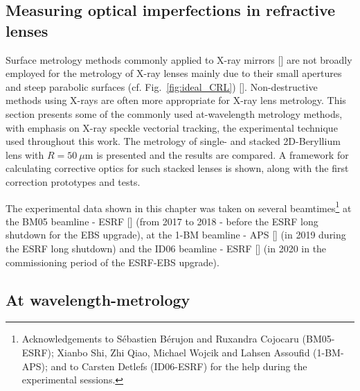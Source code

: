 \begin{refsection}
\chapter{Measuring optical imperfections in refractive lenses}\label{sec:measuring}

Surface metrology methods commonly applied to X-ray mirrors [\cite{Alcock2016, Vivo2019}] are not broadly employed for the metrology of X-ray lenses mainly due to their small apertures and steep parabolic surfaces (cf. Fig.~\ref{fig:ideal_CRL}) [\cite{Lyatun2015}]. Non-destructive methods using X-rays are often more appropriate for X-ray lens metrology. This section presents some of the commonly used at-wavelength metrology methods, with emphasis on X-ray speckle vectorial tracking, the experimental technique used throughout this work. The metrology of single- and stacked 2D-Beryllium lens with $R=50~\mu$m is presented and the results are compared. A framework for calculating corrective optics for such stacked lenses is shown, along with the first correction prototypes and tests.

The experimental data shown in this chapter was taken on several beamtimes\footnote{Acknowledgements to Sébastien Bérujon and Ruxandra Cojocaru (BM05-ESRF); Xianbo Shi, Zhi Qiao, Michael Wojcik and Lahsen Assoufid (1-BM-APS); and to Carsten Detlefs (ID06-ESRF) for the help during the experimental sessions.} at the BM05 beamline - ESRF [\cite{Ziegler2004}] (from 2017 to 2018 - before the ESRF long shutdown for the EBS upgrade), at the 1-BM beamline - APS [\cite{Macrander2016}] (in 2019 during the ESRF long shutdown) and the ID06 beamline - ESRF [\cite{Kutsal_2019}] (in 2020 in the commissioning period of the ESRF-EBS upgrade).


\section{At wavelength-metrology}\label{sec:at_wavelength}


\end{refsection}
